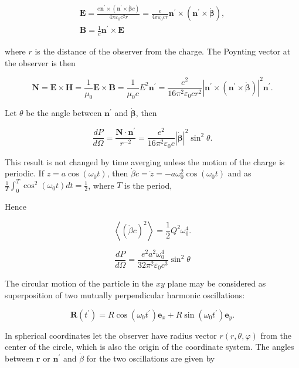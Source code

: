 \documentclass[10pt]{article}
\begin{document}
$$
\begin{gathered}
\mathbf{E}=\frac{e \mathbf{n}^{\prime} \times\left(\mathbf{n}^{\prime} \times \dot{\boldsymbol{\beta}} c\right)}{4 \pi \varepsilon_{0} c^{2} r}=\frac{e}{4 \pi \varepsilon_{0} c r} \mathbf{n}^{\prime} \times\left(\mathbf{n}^{\prime} \times \dot{\boldsymbol{\beta}}\right), \\
\mathbf{B}=\frac{1}{c} \mathbf{n}^{\prime} \times \mathbf{E}
\end{gathered}
$$

where $r$ is the distance of the observer from the charge. The Poynting vector at the observer is then

$$
\mathbf{N}=\mathbf{E} \times \mathbf{H}=\frac{1}{\mu_{0}} \mathbf{E} \times \mathbf{B}=\frac{1}{\mu_{0} c} E^{2} \mathbf{n}^{\prime}=\frac{e^{2}}{16 \pi^{2} \varepsilon_{0} c r^{2}}\left|\mathbf{n}^{\prime} \times\left(\mathbf{n}^{\prime} \times \dot{\boldsymbol{\beta}}\right)\right|^{2} \mathbf{n}^{\prime} .
$$

Let $\theta$ be the angle between $\mathbf{n}^{\prime}$ and $\dot{\boldsymbol{\beta}}$, then

$$
\frac{d P}{d \Omega}=\frac{\mathbf{N} \cdot \mathbf{n}^{\prime}}{r^{-2}}=\frac{e^{2}}{16 \pi^{2} \varepsilon_{0} c}|\dot{\boldsymbol{\beta}}|^{2} \sin ^{2} \theta .
$$

This result is not changed by time averging unless the motion of the charge is periodic.
 If $z=a \cos \left(\omega_{0} t\right)$, then $\dot{\beta} c=\ddot{z}=-a \omega_{0}^{2} \cos \left(\omega_{0} t\right)$ and as $\frac{1}{T} \int_{0}^{T} \cos ^{2}\left(\omega_{0} t\right) d t=\frac{1}{2}$, where $T$ is the period,

Hence

$$
\left\langle(\dot{\beta} c)^{2}\right\rangle=\frac{1}{2} Q^{2} \omega_{0}^{4} .
$$

$$
\frac{d P}{d \Omega}=\frac{e^{2} a^{2} \omega_{0}^{4}}{32 \pi^{2} \varepsilon_{0} c^{3}} \sin ^{2} \theta
$$

 The circular motion of the particle in the $x y$ plane may be considered as superposition of two mutually perpendicular harmonic oscillations:

$$
\mathbf{R}\left(t^{\prime}\right)=R \cos \left(\omega_{0} t^{\prime}\right) \mathbf{e}_{x}+R \sin \left(\omega_{0} t^{\prime}\right) \mathbf{e}_{y} .
$$

In spherical coordinates let the observer have radius vector $r(r, \theta, \varphi)$ from the center of the circle, which is also the origin of the coordinate system. The angles between $\mathbf{r}$ or $\mathbf{n}^{\prime}$ and $\dot{\beta}$ for the two oscillations are given by
\end{document}
